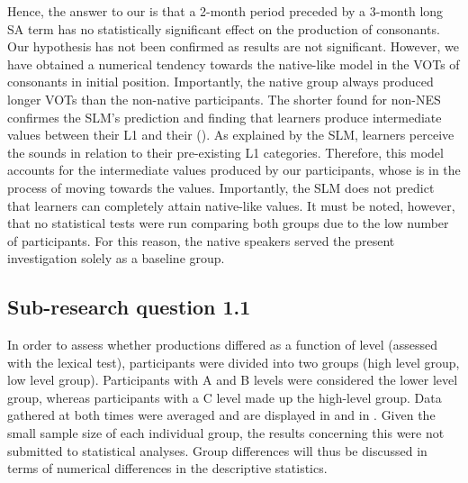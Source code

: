 \documentclass[output=paper]{langsci/langscibook}
\begin{document}
  Hence, the answer to our  is that a 2-month  period preceded by a 3-month long SA term has no statistically significant effect on the  production of   consonants. Our hypothesis has not been confirmed as results are not significant. However, we have obtained a numerical tendency towards the native-like model in the VOTs of  consonants in initial position. Importantly, the native group always produced longer VOTs than the non-native participants. The shorter  found for non-NES confirmes the SLM’s prediction and finding that  learners produce intermediate  values between their L1 and their  (\citealt{Flege1987,Flege1995,FlegeEtAl1998,ReisNobre-Oliveira2007,Yavaş2007,Mora2008,Wrembel2011,Wrembel2013,SchwartzhauptEtAl2014,AlvesZimmer2015}). As explained by the SLM, learners perceive the  sounds in relation to their pre-existing L1 categories. Therefore, this model accounts for the intermediate  values produced by our participants, whose  is in the process of moving towards the  values. Importantly, the SLM does not predict that learners can completely attain native-like  values.  It must be noted, however, that no statistical tests were run comparing both groups due to the low number of participants. For this reason, the native speakers served the present investigation solely as a baseline group.



\subsection{Sub-research question 1.1}



In order to assess whether  productions differed as a function of  level (assessed with the lexical test), participants were divided into two  groups (high level group, low level group). Participants with A and B  levels were considered the lower level group, whereas participants with a C level made up the high-level group. Data gathered at both times were averaged and are displayed in  and in . Given the small sample size of each individual group, the results concerning this  were not submitted to statistical analyses. Group differences will thus be discussed in terms of numerical differences in the descriptive statistics.
\end{document}

